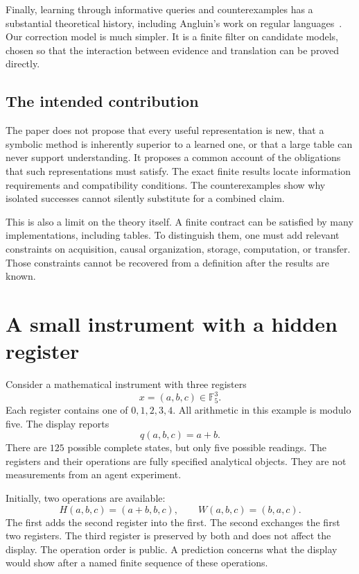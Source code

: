 \documentclass[11pt,letterpaper]{article}
\theoremstyle{plain}
\theoremstyle{definition}
\newcommand{\Ffive}{\mathbb F_5}\newcommand{\TV}{d_{\mathrm{TV}}}
\begin{document}
Finally, learning through informative queries and counterexamples has a substantial theoretical history, including Angluin's work on regular languages~\cite{angluin}. Our correction model is much simpler. It is a finite filter on candidate models, chosen so that the interaction between evidence and translation can be proved directly.

\subsection{The intended contribution}
The paper does not propose that every useful representation is new, that a symbolic method is inherently superior to a learned one, or that a large table can never support understanding. It proposes a common account of the obligations that such representations must satisfy. The exact finite results locate information requirements and compatibility conditions. The counterexamples show why isolated successes cannot silently substitute for a combined claim.

This is also a limit on the theory itself. A finite contract can be satisfied by many implementations, including tables. To distinguish them, one must add relevant constraints on acquisition, causal organization, storage, computation, or transfer. Those constraints cannot be recovered from a definition after the results are known.

\section{A small instrument with a hidden register}\label{sec:instrument}
Consider a mathematical instrument with three registers
\[
x=(a,b,c)\in\Ffive^3.
\]
Each register contains one of $0,1,2,3,4$. All arithmetic in this example is modulo five. The display reports
\[
q(a,b,c)=a+b.
\]
There are $125$ possible complete states, but only five possible readings. The registers and their operations are fully specified analytical objects. They are not measurements from an agent experiment.

Initially, two operations are available:
\begin{equation}\label{eq:instrument-ops}
H(a,b,c)=(a+b,b,c),\qquad W(a,b,c)=(b,a,c).
\end{equation}
The first adds the second register into the first. The second exchanges the first two registers. The third register is preserved by both and does not affect the display. The operation order is public. A prediction concerns what the display would show after a named finite sequence of these operations.
\end{document}
